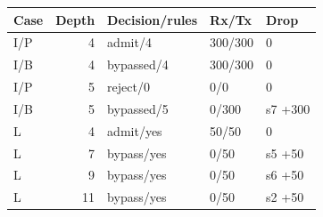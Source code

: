 \begin{tabular}{@{}lrlll@{}}
\toprule
Case & Depth & Decision/rules & Rx/Tx & Drop \\
\midrule
I/P & 4 & admit/4 & 300/300 & 0 \\
I/B & 4 & bypassed/4 & 300/300 & 0 \\
I/P & 5 & reject/0 & 0/0 & 0 \\
I/B & 5 & bypassed/5 & 0/300 & s7 +300 \\
\midrule
L & 4 & admit/yes & 50/50 & 0 \\
L & 7 & bypass/yes & 0/50 & s5 +50 \\
L & 9 & bypass/yes & 0/50 & s6 +50 \\
L & 11 & bypass/yes & 0/50 & s2 +50 \\
\bottomrule
\end{tabular}
